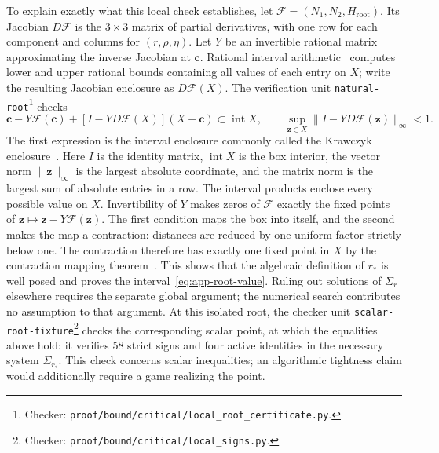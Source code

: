 \documentclass[11pt]{article}
\theoremstyle{remark}
\theoremstyle{plain}
\begin{document}
To explain exactly what this local check establishes, let
$\mathcal F=(N_1,N_2,H_{\mathrm{root}})$. Its Jacobian $D\mathcal F$ is
the $3\times3$ matrix of partial derivatives, with one row for each
component and columns for $(r,\rho,\eta)$. Let $Y$ be an invertible
rational matrix approximating the inverse Jacobian at $\boldsymbol c$.
Rational interval arithmetic~\cite{moore2009} computes lower and upper rational bounds
containing all values of each entry on $X$; write the resulting
Jacobian enclosure as $D\mathcal F(X)$. The verification unit
\nolinkurl{natural-root}\footnote{Checker:
\nolinkurl{proof/bound/critical/local_root_certificate.py}.\label{fn:checker-natural-root}} checks
\begin{equation}
 \boldsymbol c-Y\mathcal F(\boldsymbol c)
   +[I-YD\mathcal F(X)](X-\boldsymbol c)
       \subset\operatorname{int}X,\qquad
 \sup_{\boldsymbol z\in X}
       \|I-YD\mathcal F(\boldsymbol z)\|_\infty<1.
 \label{eq:app-root-contraction}
\end{equation}
The first expression is the interval enclosure commonly called the
Krawczyk enclosure~\cite{krawczyk1969}. Here $I$ is the identity matrix,
$\operatorname{int}X$ is the box interior, the vector norm
$\|\boldsymbol z\|_\infty$ is the largest absolute coordinate, and
the matrix norm is the largest sum of absolute entries in a row.
The interval products enclose every possible value on $X$.
Invertibility of $Y$ makes zeros of $\mathcal F$ exactly the fixed
points of $\boldsymbol z\mapsto\boldsymbol z-Y\mathcal F(\boldsymbol z)$.
The first condition maps the box into itself, and the second makes
the map a contraction: distances are reduced by one uniform factor
strictly below one. The contraction therefore has exactly one fixed
point in $X$ by the contraction mapping
theorem~\cite{rudin1976}. This shows that the algebraic definition
of $r_*$ is well posed and proves the
interval~\eqref{eq:app-root-value}. Ruling out solutions of $\Sigma_r$
elsewhere requires the separate global argument; the numerical search
contributes no assumption to that argument.
At this isolated root, the checker unit \nolinkurl{scalar-root-fixture}\footnote{Checker:
\nolinkurl{proof/bound/critical/local_signs.py}.\label{fn:checker-scalar-root-fixture}}
checks the corresponding scalar point, at which the equalities above
hold: it verifies 58 strict signs and four active identities in the
necessary system $\Sigma_{r_*}$.
This check concerns scalar inequalities; an algorithmic tightness
claim would additionally require a game realizing the point.
\end{document}
